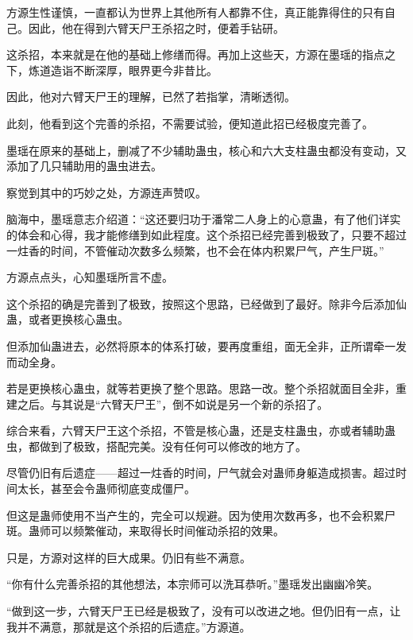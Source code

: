 
\begin{this_body}



方源生性谨慎，一直都认为世界上其他所有人都靠不住，真正能靠得住的只有自己。因此，他在得到六臂天尸王杀招之时，便着手钻研。

这杀招，本来就是在他的基础上修缮而得。再加上这些天，方源在墨瑶的指点之下，炼道造诣不断深厚，眼界更今非昔比。

因此，他对六臂天尸王的理解，已然了若指掌，清晰透彻。

此刻，他看到这个完善的杀招，不需要试验，便知道此招已经极度完善了。

墨瑶在原来的基础上，删减了不少辅助蛊虫，核心和六大支柱蛊虫都没有变动，又添加了几只辅助用的蛊虫进去。

察觉到其中的巧妙之处，方源连声赞叹。

脑海中，墨瑶意志介绍道：“这还要归功于潘常二人身上的心意蛊，有了他们详实的体会和心得，我才能修缮到如此程度。这个杀招已经完善到极致了，只要不超过一炷香的时间，不管催动次数多么频繁，也不会在体内积累尸气，产生尸斑。”

方源点点头，心知墨瑶所言不虚。

这个杀招的确是完善到了极致，按照这个思路，已经做到了最好。除非今后添加仙蛊，或者更换核心蛊虫。

但添加仙蛊进去，必然将原本的体系打破，要再度重组，面无全非，正所谓牵一发而动全身。

若是更换核心蛊虫，就等若更换了整个思路。思路一改。整个杀招就面目全非，重建之后。与其说是“六臂天尸王”，倒不如说是另一个新的杀招了。

综合来看，六臂天尸王这个杀招，不管是核心蛊，还是支柱蛊虫，亦或者辅助蛊虫，都做到了极致，搭配完美。没有任何可以修改的地方了。

尽管仍旧有后遗症——超过一炷香的时间，尸气就会对蛊师身躯造成损害。超过时间太长，甚至会令蛊师彻底变成僵尸。

但这是蛊师使用不当产生的，完全可以规避。因为使用次数再多，也不会积累尸斑。蛊师可以频繁催动，来取得长时间催动杀招的效果。

只是，方源对这样的巨大成果。仍旧有些不满意。

“你有什么完善杀招的其他想法，本宗师可以洗耳恭听。”墨瑶发出幽幽冷笑。

“做到这一步，六臂天尸王已经是极致了，没有可以改进之地。但仍旧有一点，让我并不满意，那就是这个杀招的后遗症。”方源道。


\end{this_body}
